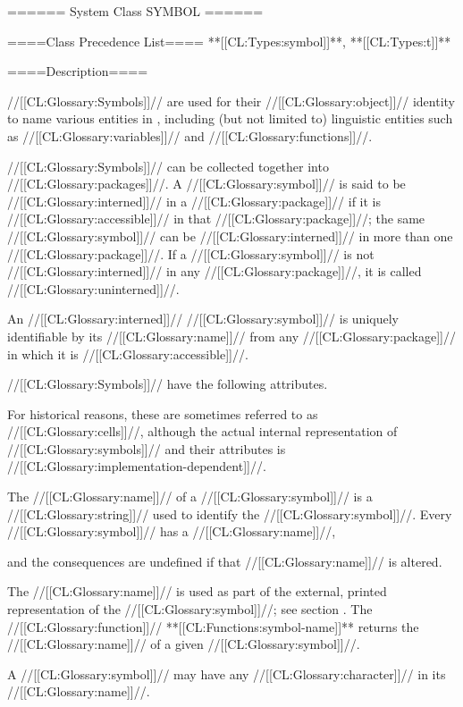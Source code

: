 ====== System Class SYMBOL ======

====Class Precedence List==== **[[CL:Types:symbol]]**, **[[CL:Types:t]]**

====Description====

//[[CL:Glossary:Symbols]]// are used for their //[[CL:Glossary:object]]// identity to name various entities in \clisp, including (but not limited to) linguistic entities such as //[[CL:Glossary:variables]]// and //[[CL:Glossary:functions]]//.

//[[CL:Glossary:Symbols]]// can be collected together into //[[CL:Glossary:packages]]//. A //[[CL:Glossary:symbol]]// is said to be //[[CL:Glossary:interned]]// in a //[[CL:Glossary:package]]// if it is //[[CL:Glossary:accessible]]// in that //[[CL:Glossary:package]]//; the same //[[CL:Glossary:symbol]]// can be //[[CL:Glossary:interned]]// in more than one //[[CL:Glossary:package]]//. If a //[[CL:Glossary:symbol]]// is not //[[CL:Glossary:interned]]// in any //[[CL:Glossary:package]]//, it is called //[[CL:Glossary:uninterned]]//.

An //[[CL:Glossary:interned]]// //[[CL:Glossary:symbol]]// is uniquely identifiable by its //[[CL:Glossary:name]]// from any //[[CL:Glossary:package]]// in which it is //[[CL:Glossary:accessible]]//.

//[[CL:Glossary:Symbols]]// have the following attributes.

For historical reasons, these are sometimes referred to as //[[CL:Glossary:cells]]//, although the actual internal representation of //[[CL:Glossary:symbols]]// and their attributes is //[[CL:Glossary:implementation-dependent]]//.

\beginlist


The //[[CL:Glossary:name]]// of a //[[CL:Glossary:symbol]]// is a //[[CL:Glossary:string]]// used to identify the //[[CL:Glossary:symbol]]//. Every //[[CL:Glossary:symbol]]// has a //[[CL:Glossary:name]]//,

and the consequences are undefined if that //[[CL:Glossary:name]]// is altered.

The //[[CL:Glossary:name]]// is used as part of the external, printed representation of the //[[CL:Glossary:symbol]]//; see section {\secref\CharacterSyntax}. The //[[CL:Glossary:function]]// **[[CL:Functions:symbol-name]]** returns the //[[CL:Glossary:name]]// of a given //[[CL:Glossary:symbol]]//.

A //[[CL:Glossary:symbol]]// may have any //[[CL:Glossary:character]]// in its //[[CL:Glossary:name]]//.

